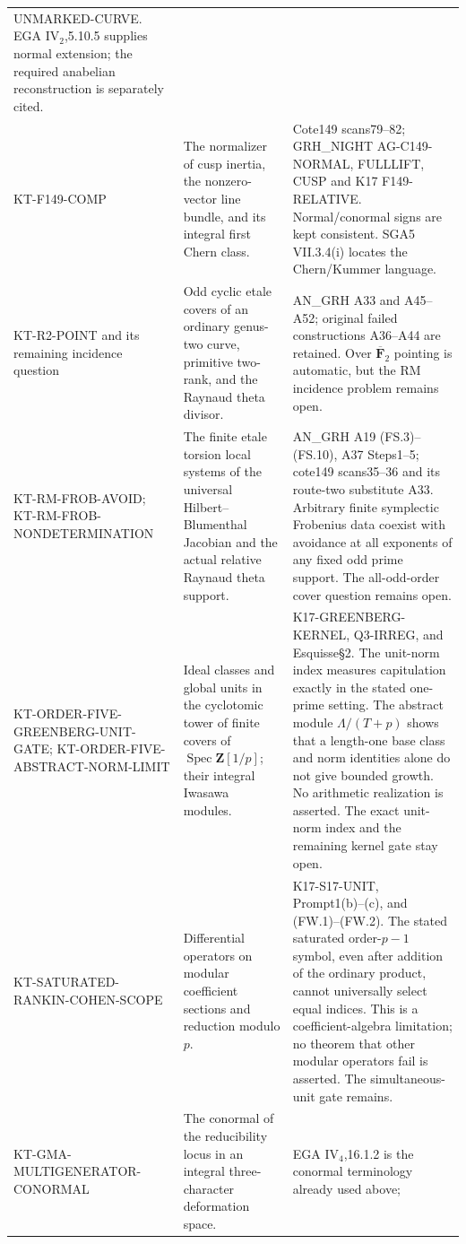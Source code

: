 \documentclass[11pt,a4paper]{article}
\theoremstyle{definition}
\begin{document}
\begin{longtable}{>{\raggedright\arraybackslash}p{}
>{\raggedright\arraybackslash}p{}
>{\raggedright\arraybackslash}p{}}
UNMARKED-CURVE. EGA IV$_2$,5.10.5 supplies normal extension;
the required anabelian reconstruction is separately cited.\\
KT-F149-COMP &
The normalizer of cusp inertia, the nonzero-vector line bundle,
and its integral first Chern class. &
Cote149 scans79--82; GRH\_NIGHT AG-C149-NORMAL, FULLLIFT,
CUSP and K17 F149-RELATIVE. Normal/conormal signs are kept
consistent. SGA5 VII.3.4(i) locates the Chern/Kummer language.\\
KT-R2-POINT and its remaining incidence question &
Odd cyclic etale covers of an ordinary genus-two curve,
primitive two-rank, and the Raynaud theta divisor. &
AN\_GRH A33 and A45--A52; original failed constructions
A36--A44 are retained. Over $\overline{\mathbf F}_2$ pointing
is automatic, but the RM incidence problem remains open.\\
KT-RM-FROB-AVOID; KT-RM-FROB-NONDETERMINATION &
The finite etale torsion local systems of the universal
Hilbert--Blumenthal Jacobian and the actual relative
Raynaud theta support. &
AN\_GRH A19 (FS.3)--(FS.10), A37 Steps1--5;
cote149 scans35--36 and its route-two substitute A33.
Arbitrary finite symplectic Frobenius data coexist with
avoidance at all exponents of any fixed odd prime support.
The all-odd-order cover question remains open.\\
KT-ORDER-FIVE-GREENBERG-UNIT-GATE;
KT-ORDER-FIVE-ABSTRACT-NORM-LIMIT &
Ideal classes and global units in the cyclotomic tower of
finite covers of $\operatorname{Spec}\mathbf Z[1/p]$;
their integral Iwasawa modules. &
K17-GREENBERG-KERNEL, Q3-IRREG, and Esquisse\S2.
The unit-norm index measures capitulation exactly in the stated
one-prime setting. The abstract module $\Lambda/(T+p)$
shows that a length-one base class and norm identities alone
do not give bounded growth. No arithmetic realization is asserted.
The exact unit-norm index and the remaining kernel gate stay open.\\
KT-SATURATED-RANKIN-COHEN-SCOPE &
Differential operators on modular coefficient sections and
reduction modulo $p$. &
K17-S17-UNIT, Prompt1(b)--(c), and (FW.1)--(FW.2).
The stated saturated order-$p-1$ symbol, even after addition
of the ordinary product, cannot universally select equal indices.
This is a coefficient-algebra limitation; no theorem that other
modular operators fail is asserted. The simultaneous-unit gate remains.\\
KT-GMA-MULTIGENERATOR-CONORMAL &
The conormal of the reducibility locus in an integral
three-character deformation space. &
EGA IV$_4$,16.1.2 is the conormal terminology already used above;

\end{longtable}
\end{document}
